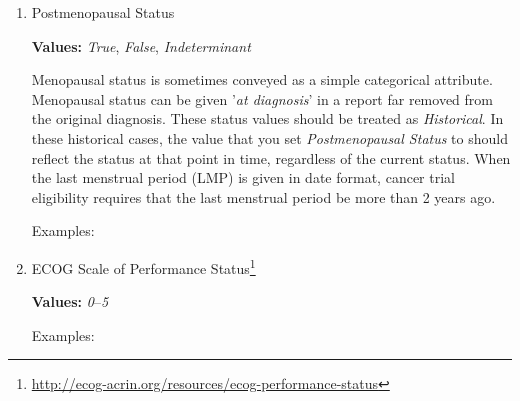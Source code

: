 \documentclass[letterpaper]{article}
\newcommand{\prefixDeep}[3]{%
  #1 %
  \tikz[baseline={([yshift={-\ht\strutbox}]a\x.north)},outer sep=0pt,inner sep=0pt]{%
    \node[align=center] (a\x) {%
      \strut \hl{#2}};%
  } %
  #3
}
\newcommand{\suffixDeep}{%
  \tikz[overlay]{ \draw[<->,thick] (b\x.west) -| (a\x.south); }%
  \pgfmathparse{int(\x+1)}%
  \xdef\x{\pgfmathresult}%
}
\newcommand{\twoDeep}[4]{%
  \begin{flushright}
  \tikz{
    \node[attrbox,align=right] (b\x) {%
      #1:  #2\\%
      #3:  #4%
    };%
  }
  \end{flushright}
  \suffixDeep
}
\newcommand{\menopause}[2]{\twoDeep{Postmenopausal Status}{#1}{Historical}{#2}}
\newcommand{\ecog}[2]{\twoDeep{ECOG}{#1}{Historical}{#2}}
\begin{document}
\begin{enumerate}
\item
  Postmenopausal Status

  \textbf{Values:}  \textsl{True}, \textsl{False}, \textsl{Indeterminant}
  
  Menopausal status is sometimes conveyed as a simple categorical attribute.
  Menopausal status can be given '\textsl{at diagnosis}' in a report far removed from the original diagnosis.
  These status values should be treated as \textsl{Historical}.
  In these historical cases, the value that you set \textsl{Postmenopausal Status} to should reflect the status at that point in time, regardless of the current status.
  When the last menstrual period (LMP) is given in date format, cancer trial eligibility requires that the last menstrual period be more than 2 years ago.

  Examples:

\item
  ECOG Scale of Performance Status\footnote{\url{http://ecog-acrin.org/resources/ecog-performance-status}}
  
  \textbf{Values:}  \textsl{0}--\textsl{5}
  
  Examples:
\end{enumerate}
\end{document}

